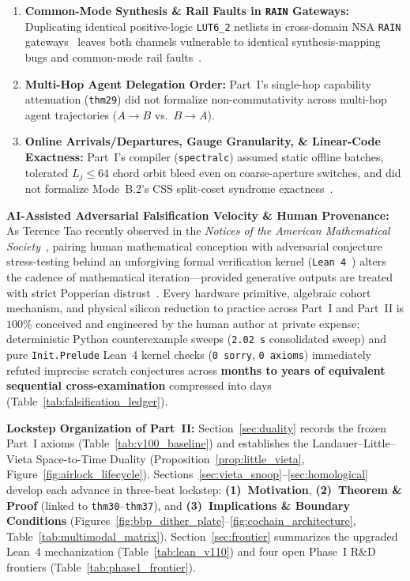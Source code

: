 \documentclass[10pt,twocolumn]{article}
\theoremstyle{spectralthm}
\begin{document}
\begin{enumerate}
  \item \textbf{Common-Mode Synthesis \& Rail Faults in \texttt{RAIN} Gateways:} Duplicating identical positive-logic \mbox{\texttt{LUT6\_2}} netlists in cross-domain NSA \texttt{RAIN} gateways~\cite{ncdsmo2020rain} leaves both channels vulnerable to identical synthesis-mapping bugs and common-mode rail faults~\cite{mitra2000commonmode}.
  \item \textbf{Multi-Hop Agent Delegation Order:} Part~I's single-hop capability attenuation (\texttt{thm29}) did not formalize non-commutativity across multi-hop agent trajectories ($A \to B$ vs.\ $B \to A$).
  \item \textbf{Online Arrivals/Departures, Gauge Granularity, \& Linear-Code Exactness:} Part~I's compiler (\texttt{spectralc}) assumed static offline batches, tolerated $L_j \le 64$ chord orbit bleed even on coarse-aperture switches, and did not formalize Mode~B.2's CSS split-coset syndrome exactness~\cite{calderbank1996good}.
\end{enumerate}

\noindent\textbf{AI-Assisted Adversarial Falsification Velocity \& Human Provenance:}
As Terence Tao recently observed in the \textit{Notices of the American Mathematical Society}~\cite{tao2025machine}, pairing human mathematical conception with adversarial conjecture stress-testing behind an unforgiving formal verification kernel (\texttt{Lean~4}~\cite{demoura2021lean4}) alters the cadence of mathematical iteration---provided generative outputs are treated with strict Popperian distrust~\cite{popper1959logic}. Every hardware primitive, algebraic cohort mechanism, and physical silicon reduction to practice across Part~I and Part~II is $100\%$ conceived and engineered by the human author at private expense; deterministic Python counterexample sweeps (\texttt{2.02~s} consolidated sweep) and pure \texttt{Init.Prelude} Lean~4 kernel checks (\texttt{0 sorry}, \texttt{0 axioms}) immediately refuted imprecise scratch conjectures across \textbf{months to years of equivalent sequential cross-examination} compressed into days (Table~\ref{tab:falsification_ledger}).

\noindent\textbf{Lockstep Organization of Part~II:}
Section~\ref{sec:duality} records the frozen Part~I axioms (Table~\ref{tab:v100_baseline}) and establishes the Landauer--Little--Vieta Space-to-Time Duality (Proposition~\ref{prop:little_vieta}, Figure~\ref{fig:airlock_lifecycle}). Sections~\ref{sec:vieta_snoop}--\ref{sec:homological} develop each advance in three-beat lockstep: \textbf{(1)~Motivation}, \textbf{(2)~Theorem \& Proof} (linked to \texttt{thm30}--\texttt{thm37}), and \textbf{(3)~Implications \& Boundary Conditions} (Figures~\ref{fig:bbp_dither_plate}--\ref{fig:cochain_architecture}, Table~\ref{tab:multimodal_matrix}). Section~\ref{sec:frontier} summarizes the upgraded Lean~4 mechanization (Table~\ref{tab:lean_v110}) and four open Phase~I R\&D frontiers (Table~\ref{tab:phase1_frontier}).
\end{document}
